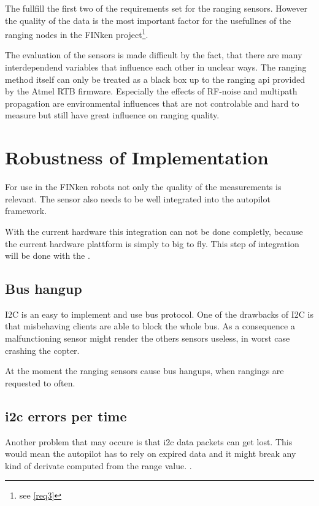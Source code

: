 The  fullfill the first two of the requirements set for the ranging sensors.
However the quality of the data is the most important factor for the usefullnes of the ranging nodes in the FINken project\footnote{see \autoref{req3}}.

The evaluation of the sensors is made difficult by the fact, that there are many interdependend variables that influence each other in unclear ways.
The ranging method itself can only be treated as a black box up to the ranging api provided by the Atmel RTB firmware.
Especially the effects of RF-noise and multipath propagation are environmental influences that are not controlable and hard to measure but still have great influence on ranging quality.

\section{Robustness of Implementation}

For use in the FINken robots not only the quality of the measurements is relevant.
The sensor also needs to be well integrated into the autopilot framework.

With the current hardware this integration can not be done completly, because the current hardware plattform is simply to big to fly.
This step of integration will be done with the .

\subsection{Bus hangup}
I2C is an easy to implement and use bus protocol.
One of the drawbacks of I2C is that misbehaving clients are able to block the whole bus.
As a consequence a malfunctioning sensor might render the others sensors useless, in worst case crashing the copter.

At the moment the ranging sensors cause bus hangups, when rangings are requested to often.

\subsection{i2c errors per time}
Another problem that may occure is that i2c data packets can get lost.
This would mean the autopilot has to rely on expired data and it might break any kind of derivate computed from the range value. .

